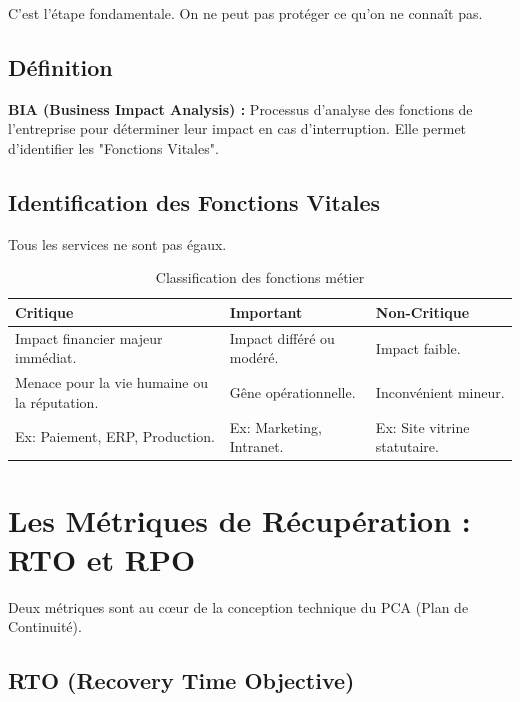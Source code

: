 C'est l'étape fondamentale. On ne peut pas protéger ce qu'on ne connaît pas.

\subsection{Définition}

\begin{boxdef}
\textbf{BIA (Business Impact Analysis) :} Processus d'analyse des fonctions de l'entreprise pour déterminer leur impact en cas d'interruption. Elle permet d'identifier les "Fonctions Vitales".
\end{boxdef}

\subsection{Identification des Fonctions Vitales}

Tous les services ne sont pas égaux.

\begin{table}[htbp]
\centering
\begin{tabular}{p{4cm}p{4cm}p{4cm}}
    \toprule
    \textbf{Critique} & \textbf{Important} & \textbf{Non-Critique} \\
    \midrule
    Impact financier majeur immédiat. & Impact différé ou modéré. & Impact faible. \\
    Menace pour la vie humaine ou la réputation. & Gêne opérationnelle. & Inconvénient mineur. \\
    Ex: Paiement, ERP, Production. & Ex: Marketing, Intranet. & Ex: Site vitrine statutaire. \\
    \bottomrule
\end{tabular}
\caption{Classification des fonctions métier}
\end{table}

\section{Les Métriques de Récupération : RTO et RPO}

Deux métriques sont au cœur de la conception technique du PCA (Plan de Continuité).

\subsection{RTO (Recovery Time Objective)}

